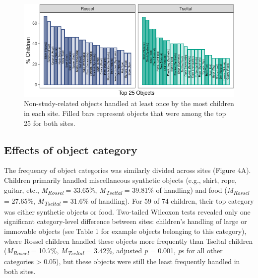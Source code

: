 \documentclass[10pt, letterpaper]{article}
\newenvironment{CodeChunk}{}{}
\begin{document}
\begin{CodeChunk}
\begin{figure}[!ht]

{\centering \includegraphics{figs/top-objects-fig-1} 

}

\caption[Non-study-related objects handled at least once by the most children in each site]{Non-study-related objects handled at least once by the most children in each site. Filled bars represent objects that were among the top 25 for both sites.}\label{fig:top-objects-fig}
\end{figure}
\end{CodeChunk}

\hypertarget{effects-of-object-category}{%
\subsection{Effects of object
category}\label{effects-of-object-category}}

The frequency of object categories was similarly divided across sites
(Figure 4A). Children primarily handled miscellaneous synthetic objects
(e.g., shirt, rope, guitar, etc., \emph{M}\textsubscript{\emph{Rossel}}
= 33.65\%, \emph{M}\textsubscript{\emph{Tseltal}} = 39.81\% of handling)
and food (\emph{M}\textsubscript{\emph{Rossel}} = 27.65\%,
\emph{M}\textsubscript{\emph{Tseltal}} = 31.6\% of handling). For 59 of
74 children, their top category was either synthetic objects or food.
Two-tailed Wilcoxon tests revealed only one significant category-level
difference between sites: children's handling of large or immovable
objects (see Table 1 for example objects belonging to this category),
where Rossel children handled these objects more frequently than Tseltal
children (\emph{M}\textsubscript{\emph{Rossel}} = 10.7\%,
\emph{M}\textsubscript{\emph{Tseltal}} = 3.42\%, adjusted \emph{p} =
0.001, \emph{p}s for all other categories \textgreater{} 0.05), but
these objects were still the least frequently handled in both sites.
\end{document}
